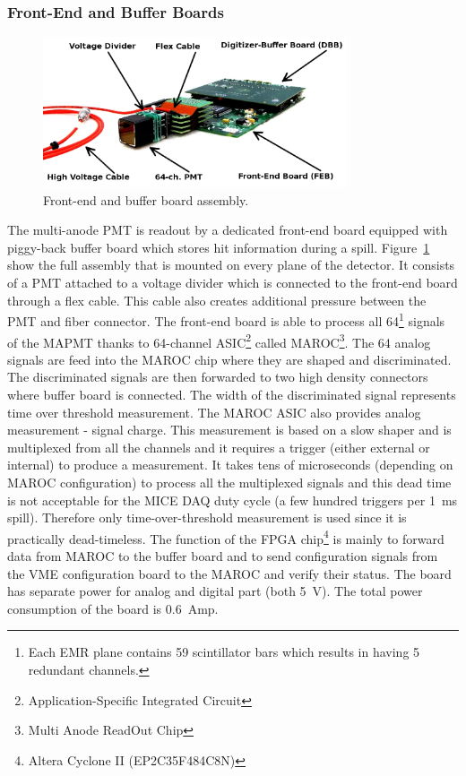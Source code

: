 \documentclass[a4paper,11pt]{article}
\begin{document}
\subsubsection{Front-End and Buffer Boards}
\begin{figure}[htp!]
 \centering
 \includegraphics[width=0.8\textwidth]{./feb_dbb}
 \caption[Front-end and buffer board assembly]{Front-end and buffer board assembly.}
 \label{fig:feb_dbb}
\end{figure}

The multi-anode PMT is readout by a dedicated front-end board equipped with piggy-back buffer board which stores hit information during a spill.
Figure~\ref{fig:feb_dbb} show the full assembly that is mounted on every plane of the detector. It consists of a PMT attached to a voltage divider
which is connected to the front-end board through a flex cable. This cable also creates additional pressure between the PMT and fiber connector.
The front-end board is able to process all 64\footnote{Each EMR plane contains 59 scintillator bars which results in having 5 redundant channels.}
signals of the MAPMT thanks to 64-channel ASIC\footnote{Application-Specific Integrated Circuit}
called MAROC\footnote{Multi Anode ReadOut Chip}. The 64 analog signals are feed into the MAROC chip where they are shaped and discriminated.
The discriminated signals are then forwarded to two high density connectors where buffer board is connected. The width of the discriminated
signal represents time over threshold measurement. The MAROC ASIC also provides analog measurement - signal charge. This measurement is based
on a slow shaper and is multiplexed from all the channels and it requires a trigger (either external or internal) to produce a measurement. It 
takes tens of microseconds (depending on MAROC configuration) to process all the multiplexed signals and this dead time is not acceptable for
the MICE DAQ duty cycle (a few hundred triggers per 1~ms spill). Therefore only time-over-threshold measurement is used since it is practically
dead-timeless. The function of the FPGA chip\footnote{Altera Cyclone II (EP2C35F484C8N)} is mainly to forward data from MAROC to the buffer board
and to send configuration signals from the VME configuration board to the MAROC and verify their status. The board has separate power for analog
and digital part (both 5~V). The total power consumption of the board is 0.6~Amp.
\end{document}
